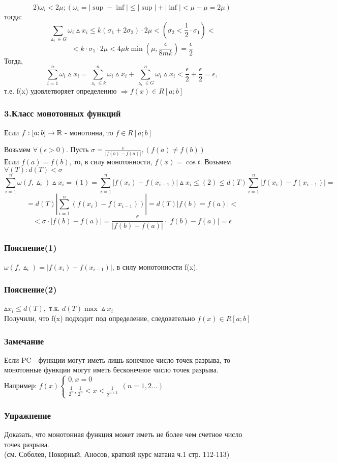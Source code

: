 $$
2) \omega_i < 2\mu; (\omega_i=|\sup-\inf|\leq |\sup|+|\inf| < \mu+\mu=2\mu)
$$
тогда:
$$
\sum_{\vartriangle_i\in G}\omega_i\vartriangle x_i \leq k(\sigma_1+2\sigma_2)\cdot 2\mu < (\sigma_2<\frac{1}{2}\cdot\sigma_1) <
$$
$$
< k\cdot\sigma_1\cdot2\mu < 4\mu k \min(\mu,\frac{\epsilon}{8mk})=\frac{\epsilon}{2}
$$
Тогда,
$$
\sum_{i=1}^{n}\omega_i\vartriangle x_i=\sum_{\vartriangle_i\in k}^{n}\omega_i\vartriangle x_i +\sum_{\vartriangle_i \in G}^{n}\omega_i\vartriangle x_i<\frac{\epsilon}{2}+\frac{\epsilon}{2} = \epsilon,
$$
т.е. f(x) удовлетворяет определению $\Rightarrow f(x)\in R[a;b]$
\dokno

\subsubsection{3.Класс монотонных функций}
\begin{teorema}
Если $f:[a;b]\to \mathbb{R}$ - монотонна, то $f\in R[a;b]$
\end{teorema}
\dokvo
Возьмем $\forall(\epsilon>0).$ Пусть $\sigma=\frac{\epsilon}{|f(b)-f(a)|},(f(a)\neq f(b))$
\\
Если $f(a)=f(b)$, то, в силу монотонности, $f(x)=\cos t.$ Возьмем $\forall(T):d(T)<\sigma$
$$
\sum_{i=1}^{n}\omega(f,\vartriangle_i)\vartriangle x_i =(1)=\sum_{i=1}^{n}|f(x_i)-f(x_{i-1})|\vartriangle x_i \leq (2) \leq d(T)\sum_{i=1}^{n}|f(x_i)-f(x_{i-1})|=
$$
$$
=d(T)|\sum_{i=1}^{n}(f(x_i)-f(x_{i-1}))|=d(T)|f(b)=f(a)|<
$$
$$
<\sigma\cdot|f(b)-f(a)|=\frac{\epsilon}{|f(b)-f(a)|}\cdot|f(b)-f(a)|=\epsilon
$$
\subsubsection{Пояснение(1)}
$\omega(f,\vartriangle_i)=|f(x_i)-f(x_{i-1})|$, в силу монотонности f(x).
\subsubsection{Пояснение(2)}
$\vartriangle x_i\leq d(T),$ т.к. $d(T)\max\vartriangle x_i$
\\
Получили, что f(x) подходит под определение, следовательно $f(x)\in R[a;b]$
\dokno

\subsubsection{Замечание}
Если PC - функции могут иметь лишь конечное число точек разрыва, то монотонные функции могут иметь бесконечное число точек разрыва.
\\
Например:
$
f(x)\left\{
\begin{array}{l}
0,x=0 \\
\frac{1}{2^n},\frac{1}{2^n}< x < \frac{1}{2^{n+1}}
\end{array}
\right. (n =1,2...)
$

\subsubsection{Упражнение}
Доказать, что монотонная функция может иметь не более чем счетное число точек разрыва.
\\
(см. Соболев, Покорный, Аносов, краткий курс матана ч.1 стр. 112-113)



